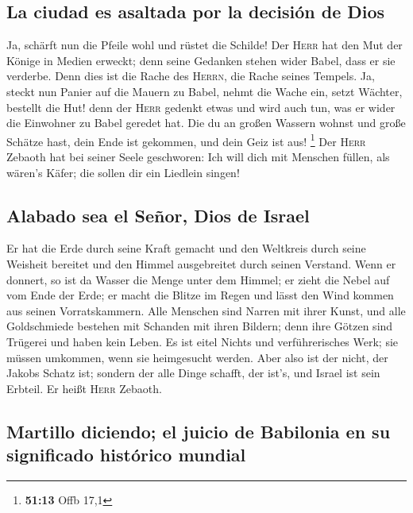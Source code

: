 \hypertarget{la-ciudad-es-asaltada-por-la-decisiuxf3n-de-dios}{%
\subsection{La ciudad es asaltada por la decisión de
Dios}\label{la-ciudad-es-asaltada-por-la-decisiuxf3n-de-dios}}

 Ja, schärft nun die Pfeile wohl und rüstet die Schilde!
Der \textsc{Herr} hat den Mut der Könige in Medien erweckt; denn seine
Gedanken stehen wider Babel, dass er sie verderbe. Denn dies ist die
Rache des \textsc{Herrn}, die Rache seines Tempels.  Ja,
steckt nun Panier auf die Mauern zu Babel, nehmt die Wache ein, setzt
Wächter, bestellt die Hut! denn der \textsc{Herr} gedenkt etwas und wird
auch tun, was er wider die Einwohner zu Babel geredet hat.
 Die du an großen Wassern wohnst und große Schätze hast,
dein Ende ist gekommen, und dein Geiz ist aus! \footnote{\textbf{51:13}
  Offb 17,1}  Der \textsc{Herr} Zebaoth hat bei seiner
Seele geschworen: Ich will dich mit Menschen füllen, als wären's Käfer;
die sollen dir ein Liedlein singen!

\hypertarget{alabado-sea-el-seuxf1or-dios-de-israel}{%
\subsection{Alabado sea el Señor, Dios de
Israel}\label{alabado-sea-el-seuxf1or-dios-de-israel}}

 Er hat die Erde durch seine Kraft gemacht und den
Weltkreis durch seine Weisheit bereitet und den Himmel ausgebreitet
durch seinen Verstand.  Wenn er donnert, so ist da Wasser
die Menge unter dem Himmel; er zieht die Nebel auf vom Ende der Erde; er
macht die Blitze im Regen und lässt den Wind kommen aus seinen
Vorratskammern.  Alle Menschen sind Narren mit ihrer
Kunst, und alle Goldschmiede bestehen mit Schanden mit ihren Bildern;
denn ihre Götzen sind Trügerei und haben kein Leben.  Es
ist eitel Nichts und verführerisches Werk; sie müssen umkommen, wenn sie
heimgesucht werden.  Aber also ist der nicht, der Jakobs
Schatz ist; sondern der alle Dinge schafft, der ist's, und Israel ist
sein Erbteil. Er heißt \textsc{Herr} Zebaoth.

\hypertarget{martillo-diciendo-el-juicio-de-babilonia-en-su-significado-histuxf3rico-mundial}{%
\subsection{Martillo diciendo; el juicio de Babilonia en su significado
histórico
mundial}\label{martillo-diciendo-el-juicio-de-babilonia-en-su-significado-histuxf3rico-mundial}}

